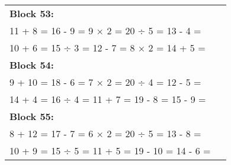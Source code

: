 \documentclass[a4paper,12pt]{scrartcl}
\begin{document}
\begin{adjustbox}{center, valign=c}
\begin{tabular}{@{}p{0.95\linewidth}@{}}
\textbf{Block 53:}\\
11 + 8 = \hfill 16 - 9 = \hfill 9 × 2 = \hfill 20 ÷ 5 = \hfill 13 - 4 =\\
10 + 6 = \hfill 15 ÷ 3 = \hfill 12 - 7 = \hfill 8 × 2 = \hfill 14 + 5 =\\[0.6em]

\textbf{Block 54:}\\
9 + 10 = \hfill 18 - 6 = \hfill 7 × 2 = \hfill 20 ÷ 4 = \hfill 12 - 5 =\\
14 + 4 = \hfill 16 ÷ 4 = \hfill 11 + 7 = \hfill 19 - 8 = \hfill 15 - 9 =\\[0.6em]

\textbf{Block 55:}\\
8 + 12 = \hfill 17 - 7 = \hfill 6 × 2 = \hfill 20 ÷ 5 = \hfill 13 - 8 =\\
10 + 9 = \hfill 15 ÷ 5 = \hfill 11 + 5 = \hfill 19 - 10 = \hfill 14 - 6 =\\[0.6em]

\end{tabular}
\end{adjustbox}
\end{document}
